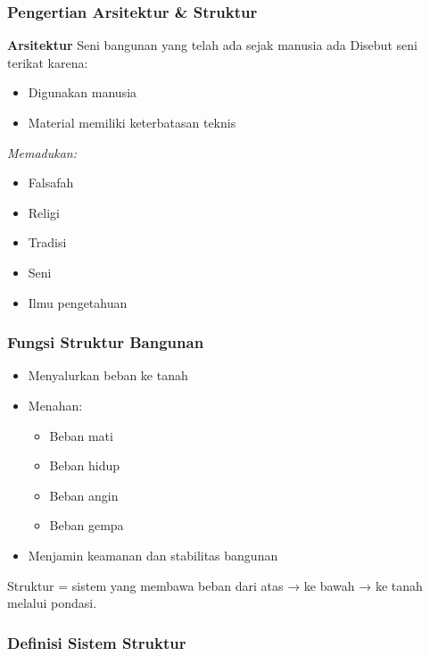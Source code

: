 \documentclass[../main.tex]{subfiles}
\begin{document}
\begin{frame}[t,mycolor=digiPH_white,mytitle=standard,light]
	\frametitle{Pengertian Arsitektur \& Struktur}

	\textbf{Arsitektur}
	\tabitem Seni bangunan yang telah ada sejak manusia ada
	\tabitem Disebut seni terikat karena:
	\begin{itemize}
		\item Digunakan manusia
		\item Material memiliki keterbatasan teknis
	\end{itemize}
	\tabitem \textit{Memadukan:}
	\begin{itemize}
		\item Falsafah
		\item Religi
		\item Tradisi
		\item Seni
		\item Ilmu pengetahuan
	\end{itemize}

\end{frame}


\begin{frame}[t,mycolor=digiPH_red,mytitle=standard,dark]

	\frametitle{Fungsi Struktur Bangunan}

	\begin{itemize}
		\item Menyalurkan beban ke tanah
		\item Menahan:
		      \begin{itemize}
			      \item Beban mati
			      \item Beban hidup
			      \item Beban angin
			      \item Beban gempa
		      \end{itemize}
		\item Menjamin keamanan dan stabilitas bangunan
	\end{itemize}

	\footnotesize Struktur = sistem yang membawa beban dari atas → ke bawah → ke tanah melalui pondasi.
\end{frame}


\begin{frame}[t,mycolor=digiPH_red,mytitle=standard,dark]
	\frametitle{Definisi Sistem Struktur}



\end{frame}
\end{document}
